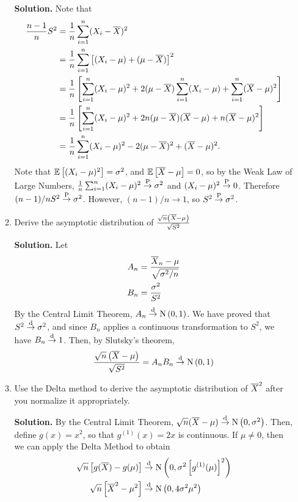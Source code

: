 \documentclass[titlepage]{article}
\begin{document}
\begin{enumerate}
\begin{enumerate}
  \textbf{Solution.} Note that
  \[\begin{aligned}
  \frac{n - 1}{n}S^2 &= \frac{1}{n}\sum_{i=1}^n(X_i - \overline{X})^2 \\
                     &= \frac{1}{n}\sum_{i=1}^n\left[(X_i - \mu) + (\mu - \overline{X})\right]^2 \\
                     &= \frac{1}{n}\left[\sum_{i=1}^n(X_i - \mu)^2 + 2(\mu - \overline{X})\sum_{i=1}^n(X_i - \mu) + \sum_{i=1}^n(\overline{X} - \mu)^2 \right] \\
                     &= \frac{1}{n}\left[\sum_{i=1}^n(X_i - \mu)^2 + 2n(\mu - \overline{X})(\overline{X} - \mu) + n(\overline{X} - \mu)^2 \right] \\
                     &= \frac{1}{n}\sum_{i=1}^n(X_i - \mu)^2 - 2(\mu - \overline{X})^2 + (\overline{X} - \mu)^2.
  \end{aligned}\]
  Note that $\mathbb{E}\left[ (X_i - \mu)^2 \right] = \sigma^2$, and $\mathbb{E}\left[ \overline{X} - \mu \right] = 0$, so by the Weak Law of Large Numbers, $\frac{1}{n}\sum_{i=1}^n(X_i - \mu)^2 \stackrel{\text{P}}{\rightarrow} \sigma^2$ and $(X_i - \mu)^2 \stackrel{\text{P}}{\rightarrow} 0$. Therefore $(n - 1)/n S^2 \stackrel{\text{P}}{\rightarrow} \sigma^2$. However, $(n - 1)/n \rightarrow 1$, so $S^2 \stackrel{\text{P}}{\rightarrow} \sigma^2$.

  \item Derive the asymptotic distribution of $\frac{\sqrt{n}\left(\overline{X} - \mu\right)}{\sqrt{S^2}}$

  \textbf{Solution.} Let
    \[\begin{aligned}
    A_n &= \frac{\overline{X}_n - \mu}{\sqrt{\sigma^2/n}}\\
    B_n &= \frac{\sigma^2}{S^2}
    \end{aligned}\]
    By the Central Limit Theorem, $A_n \stackrel{\text{d}}{\rightarrow} \text{N}\left( 0, 1 \right)$. We have proved that $S^2 \stackrel{\text{d}}{\rightarrow} \sigma^2$, and since $B_n$ applies a continuous transformation to $S^2$, we have $B_n \stackrel{\text{d}}{\rightarrow} 1$. Then, by Slutsky's theorem,
    \[\frac{\sqrt{n}\left(\overline{X} - \mu\right)}{\sqrt{S^2}} = A_n B_n \stackrel{\text{d}}{\rightarrow} \text{N}\left( 0, 1 \right)\]

  \item Use the Delta method to derive the asymptotic distribution of $\overline{X}^2$ after you normalize it appropriately.

  \textbf{Solution.} By the Central Limit Theorem, $\sqrt{n}(\overline{X} -
\mu) \stackrel{\text{d}}{\rightarrow} \text{N}\left( 0, \sigma^2 \right)$. Then, define $g(x) = x^2$, so that $g^{(1)}(x) = 2x$ is continuous. If $\mu \neq 0$, then we can apply the Delta Method to obtain
\[\begin{aligned}
\sqrt{n}\left[g(\overline{X}) - g(\mu) \right] &\stackrel{\text{d}}{\rightarrow} \text{N}\left( 0, \sigma^2 \left[g^{(1)}(\mu) \right]^2 \right) \\
\sqrt{n}\left[\overline{X}^2 - \mu^2 \right] &\stackrel{\text{d}}{\rightarrow} \text{N}\left( 0, 4\sigma^2\mu^2 \right)
\end{aligned}\]
  \end{enumerate}


\end{enumerate}
\end{document}
